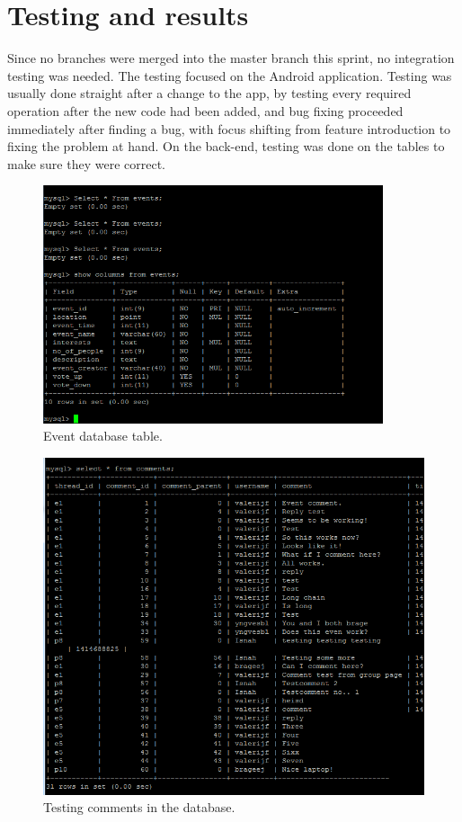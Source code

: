 \section{Testing and results}
\label{sec:S4Testing}

Since no branches were merged into the master branch this sprint, no integration testing was needed. The testing focused on the Android application. Testing was usually done straight after a change to the app, by testing every required operation after the new code had been added, and bug fixing proceeded immediately after finding a bug, with focus shifting from feature introduction to fixing the problem at hand. On the back-end, testing was done on the tables to make sure they were correct.

\begin{figure}
    \centering
    \includegraphics[width=100mm]{./Sprint4/img/eventTable}
    \caption{Event database table.}
    \label{fig:S4TestingEvent}
\end{figure}

\begin{figure}
    \centering
    \includegraphics[width=\linewidth]{./Sprint4/img/commentsDB}
    \caption{Testing comments in the database.}
    \label{fig:S4TestingComments}
\end{figure}


